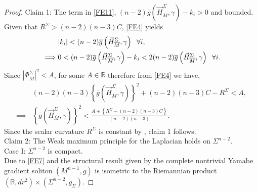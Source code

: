 \documentclass[11pt]{amsart}
\DeclareMathOperator{\Hessian}{Hess}
\numberwithin{equation}{section}
\begin{document}
\begin{proof}
 Claim 1: The term in \eqref{FE11}, $(n-2)\overline{g}\left(\vec{H}^{\Sigma}_{\overline{M}}, \gamma \right)-k_i>0$ and bounded.\\
  Given that $R^{\Sigma}> (n-2)(n-3)C$, \eqref{FE4} yields
 \begin{align}\label{FE24}
     & |k_i|<(n-2)\overline{g}\left(\vec{H}^{\Sigma}_{\overline{M}}, \gamma \right) \hspace{2mm}\forall i,\\
     \implies& 0<(n-2)\overline{g}\left(\vec{H}^{\Sigma}_{\overline{M}}, \gamma \right)-k_i< 2(n-2)\overline{g}\left(\vec{H}^{\Sigma}_{\overline{M}}, \gamma \right) \nonumber \hspace{2mm} \forall i.
 \end{align}
 Since $\left|\Phi^{\Sigma}_{\overline{M}}\right|^2<A$, for some $A\in \mathbb{R}$ therefore from \eqref{FE4} we have,
 \begin{align}\label{FE25}
     &(n-2)(n-3) \left\{\overline{g}\left(\vec{H}^{\Sigma}_{\overline{M}}, \gamma \right)\right\}^2+{(n-2)(n-3)C-R^{\Sigma}}<A, \nonumber \\
     \implies & \left\{\overline{g}\left(\vec{H}^{\Sigma}_{\overline{M}}, \gamma \right)\right\}^2<\frac{A+\left\{R^{\Sigma}-(n-2)(n-3)C\right\}}{(n-2)(n-3)}.
 \end{align}
 Since the scalar curvature $R^{\Sigma}$ is constant by \cite{CSY}, claim $1$ follows.\\
Claim $2$: The Weak maximum principle for the Laplacian \cite{aliasbook} holds on $\Sigma^{n-2}$.\\
Case I: $\Sigma^{n-2}$ is compact.\\
Due to \eqref{FE7} and the structural result given by \cite{CSY} the complete nontrivial Yamabe gradient soliton $(M^{n-1}, g)$ is isometric to the Riemannian product $(\mathbb{R}, dr^2)\times (\Sigma^{n-2}, g_{\Sigma})$.

\end{proof}
\end{document}
